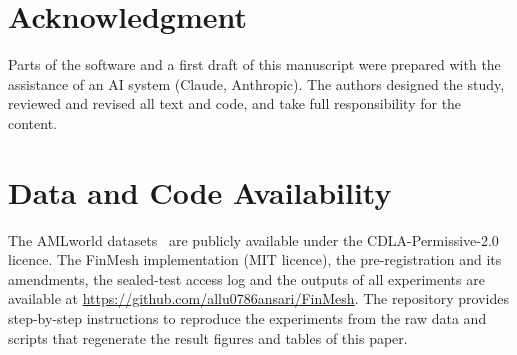 \documentclass[conference]{IEEEtran}
\begin{document}
\section*{Acknowledgment}
Parts of the software and a first draft of this manuscript were prepared with the
assistance of an AI system (Claude, Anthropic). The authors designed the study, reviewed
and revised all text and code, and take full responsibility for the content.

\section*{Data and Code Availability}
The AMLworld datasets~\cite{altman2023} are publicly available under the
CDLA-Permissive-2.0 licence. The FinMesh implementation (MIT licence), the
pre-registration and its amendments, the sealed-test access log and the outputs of
all experiments are available at
\url{https://github.com/allu0786ansari/FinMesh}.
The repository provides step-by-step instructions to reproduce the experiments
from the raw data and scripts that regenerate the result figures and tables of
this paper.



\end{document}

